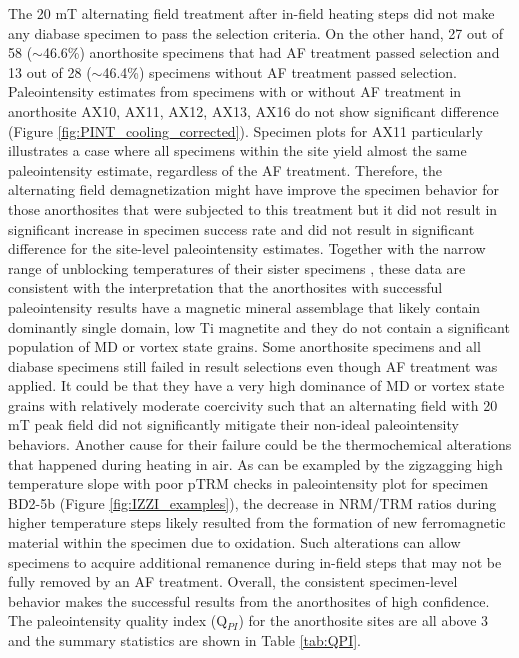 \documentclass[9pt,twocolumn,twoside,lineno]{pnas-new}
\begin{document}
The 20 mT alternating field treatment after in-field heating steps did not make any diabase specimen to pass the selection criteria. On the other hand, 27 out of 58 ($\sim$46.6\%) anorthosite specimens that had AF treatment passed selection and 13 out of 28 ($\sim$46.4\%) specimens without AF treatment passed selection. Paleointensity estimates from specimens with or without AF treatment in anorthosite AX10, AX11, AX12, AX13, AX16 do not show significant difference (Figure \ref{fig:PINT_cooling_corrected}). Specimen plots for AX11 particularly illustrates a case where all specimens within the site yield almost the same paleointensity estimate, regardless of the AF treatment. Therefore, the alternating field demagnetization might have improve the specimen behavior for those anorthosites that were subjected to this treatment but it did not result in significant increase in specimen success rate and did not result in significant difference for the site-level paleointensity estimates. Together with the narrow range of unblocking temperatures of their sister specimens \cite{Zhang2021b}, these data are consistent with the interpretation that the anorthosites with successful paleointensity results have a magnetic mineral assemblage that likely contain dominantly single domain, low Ti magnetite and they do not contain a significant population of MD or vortex state grains. Some anorthosite specimens and all diabase specimens still failed in result selections even though AF treatment was applied. It could be that they have a very high dominance of MD or vortex state grains with relatively moderate coercivity such that an alternating field with 20 mT peak field did not significantly mitigate their non-ideal paleointensity behaviors. Another cause for their failure could be the thermochemical alterations that happened during heating in air. As can be exampled by the zigzagging high temperature slope with poor pTRM checks in paleointensity plot for specimen BD2-5b (Figure \ref{fig:IZZI_examples}), the decrease in NRM/TRM ratios during higher temperature steps likely resulted from the formation of new ferromagnetic material within the specimen due to oxidation. Such alterations can allow specimens to acquire additional remanence during in-field steps that may not be fully removed by an AF treatment. Overall, the consistent specimen-level behavior makes the successful results from the anorthosites of high confidence. The paleointensity quality index (Q$_{PI}$) for the anorthosite sites are all above 3 and the summary statistics are shown in Table \ref{tab:QPI}. 
\end{document}

